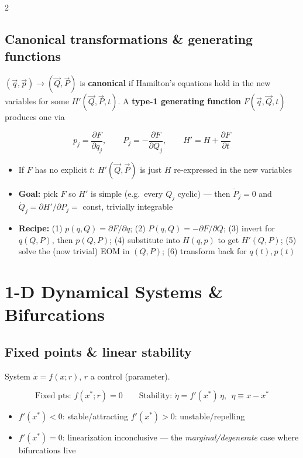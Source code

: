\documentclass[10pt]{article}
\begin{document}
\begin{multicols}{2}
\subsection*{Canonical transformations \& generating functions}
$(\vec q,\vec p)\to(\vec Q,\vec P)$ is \textbf{canonical} if Hamilton's equations hold in the new variables for some $H'(\vec Q,\vec P,t)$. A \textbf{type-1 generating function} $F(\vec q,\vec Q,t)$ produces one via
\begin{keybox}
\[
    p_j = \frac{\partial F}{\partial q_j}, \qquad P_j = -\frac{\partial F}{\partial Q_j}, \qquad H' = H+\frac{\partial F}{\partial t}
\]
\end{keybox}
\begin{itemize}[nosep, leftmargin=1.1em]
    \item If $F$ has no explicit $t$: $H'(\vec Q,\vec P)$ is just $H$ re-expressed in the new variables
    \item \textbf{Goal:} pick $F$ so $H'$ is simple (e.g.\ every $Q_j$ cyclic) --- then $\dot P_j=0$ and $\dot Q_j=\partial H'/\partial P_j=$ const, trivially integrable
    \item \textbf{Recipe:} (1) $p(q,Q)=\partial F/\partial q$; (2) $P(q,Q)=-\partial F/\partial Q$; (3) invert for $q(Q,P)$, then $p(Q,P)$; (4) substitute into $H(q,p)$ to get $H'(Q,P)$; (5) solve the (now trivial) EOM in $(Q,P)$; (6) transform back for $q(t),p(t)$
\end{itemize}

\section*{1-D Dynamical Systems \& Bifurcations}
\subsection*{Fixed points \& linear stability}
System $\dot x=f(x;r)$, $r$ a control (parameter).
\begin{keybox}
\[
    \text{Fixed pts: } f(x^*;r)=0
    \qquad
    \text{Stability: } \dot\eta = f'(x^*)\,\eta,\ \ \eta\equiv x-x^*
\]
\end{keybox}
\begin{itemize}[nosep, leftmargin=1.1em]
    \item $f'(x^*)<0$: stable/attracting \quad $f'(x^*)>0$: unstable/repelling
    \item $f'(x^*)=0$: linearization inconclusive --- the \emph{marginal/degenerate} case where bifurcations live
\end{itemize}


\end{multicols}
\end{document}
